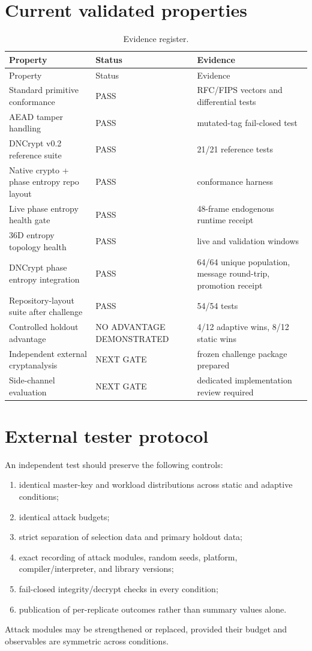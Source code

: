 \section{Current validated properties}
\begin{longtable}{p{}p{}p{}}
\caption{Evidence register.}\\
\toprule
Property & Status & Evidence\\\midrule
\endfirsthead
\toprule Property & Status & Evidence\\\midrule\endhead
Standard primitive conformance & PASS & RFC/FIPS vectors and differential tests\\
AEAD tamper handling & PASS & mutated-tag fail-closed test\\
DNCrypt v0.2 reference suite & PASS & 21/21 reference tests\\
Native crypto + phase entropy repo layout & PASS & conformance harness\\
Live phase entropy health gate & PASS & 48-frame endogenous runtime receipt\\
36D entropy topology health & PASS & live and validation windows\\
DNCrypt phase entropy integration & PASS & 64/64 unique population, message round-trip, promotion receipt\\
Repository-layout suite after challenge & PASS & 54/54 tests\\
Controlled holdout advantage & NO ADVANTAGE DEMONSTRATED & 4/12 adaptive wins, 8/12 static wins\\
Independent external cryptanalysis & NEXT GATE & frozen challenge package prepared\\
Side-channel evaluation & NEXT GATE & dedicated implementation review required\\
\bottomrule
\end{longtable}

\section{External tester protocol}
An independent test should preserve the following controls:
\begin{enumerate}
\item identical master-key and workload distributions across static and adaptive conditions;
\item identical attack budgets;
\item strict separation of selection data and primary holdout data;
\item exact recording of attack modules, random seeds, platform, compiler/interpreter, and library versions;
\item fail-closed integrity/decrypt checks in every condition;
\item publication of per-replicate outcomes rather than summary values alone.
\end{enumerate}
Attack modules may be strengthened or replaced, provided their budget and observables are symmetric across conditions.


